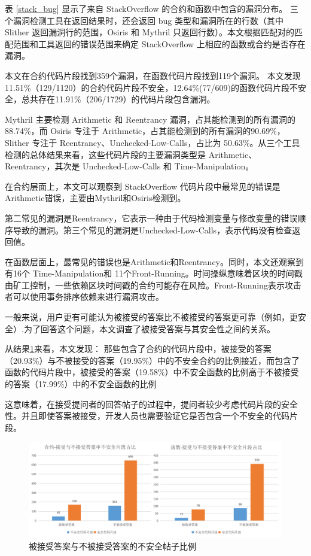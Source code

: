 表 \ref{stack_bug} 显示了来自 StackOverflow 的合约和函数中包含的漏洞分布。
三个漏洞检测工具在返回结果时，还会返回 bug 类型和漏洞所在的行数（其中 Slither 返回漏洞行的范围，Osiris 和 Mythril 只返回行数）。本文根据匹配对的匹配范围和工具返回的错误范围来确定 StackOverflow 上相应的函数或合约是否存在漏洞。

本文在合约代码片段找到359个漏洞，在函数代码片段找到119个漏洞。
本文发现11.51\%（129/1120）的合约代码片段不安全，12.64\%(77/609)的函数代码片段不安全，总共存在11.91\%（206/1729）的代码片段包含漏洞。

Mythril 主要检测 Arithmetic 和 Reentrancy 漏洞，占其能检测到的所有漏洞的 88.74\%，而 Osiris 专注于 Arithmetic，占其能检测到的所有漏洞的90.69\%，Slither 专注于 Reentrancy、Unchecked-Low-Calls，占比为 50.63\%。从三个工具检测的总体结果来看，这些代码片段的主要漏洞类型是 Arithmetic、Reentrancy，其次是 Unchecked-Low-Calls 和 Time-Manipulation。

在合约层面上，本文可以观察到 StackOverflow 代码片段中最常见的错误是Arithmetic错误，主要由Mythril和Osiris检测到。

第二常见的漏洞是Reentrancy，它表示一种由于代码检测变量与修改变量的错误顺序导致的漏洞。第三个常见的漏洞是Unchecked-Low-Calls，表示代码没有检查返回值。

在函数层面上，最常见的错误也是Arithmetic和Reentrancy。同时，本文还观察到有16个 Time-Manipulation和 11个Front-Running。时间操纵意味着区块的时间戳由矿工控制，一些依赖区块时间戳的合约可能存在风险。Front-Running表示攻击者可以使用事务排序依赖来进行漏洞攻击。

一般来说，用户更有可能认为被接受的答案比不被接受的答案\cite{developers}更可靠（例如，更安全）.为了回答这个问题，本文调查了被接受答案与其安全性之间的关系。

从结果\ref{acceptedAns}来看，本文发现：
那些包含了合约的代码片段中，被接受的答案（20.93\%）与不被接受的答案（19.95\%）中的不安全合约的比例接近，而包含了函数的代码片段中，被接受的答案（19.58\%）中不安全函数的比例高于不被接受的答案（17.99\%）中的不安全函数的比例

这意味着，在接受提问者的回答帖子的过程中，提问者较少考虑代码片段的安全性。并且即使答案被接受，开发人员也需要验证它是否包含一个不安全的代码片段。

\begin{figure}[htbp]
\centering
\includegraphics[width=1\textwidth]{figures/acceptedAns.png}
\caption{被接受答案与不被接受答案的不安全帖子比例}
\label{acceptedAns}
\end{figure}

